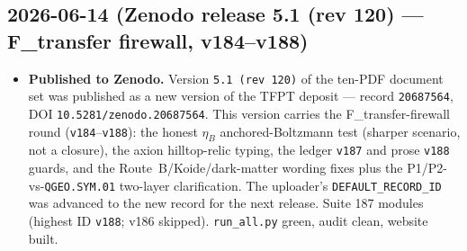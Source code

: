 \documentclass[11pt]{article}
\providecommand{\vref}[1]{\texttt{#1}}
\begin{document}
\subsection*{2026-06-14 (Zenodo release 5.1 (rev 120) --- F\_transfer firewall, v184--v188)}
\begin{itemize}
\item \textbf{Published to Zenodo.} Version \texttt{5.1 (rev 120)} of the ten-PDF document set was
  published as a new version of the TFPT deposit --- record \texttt{20687564},
  DOI \texttt{10.5281/zenodo.20687564}. This version carries the F\_transfer-firewall round
  (\vref{v184}--\vref{v188}): the honest $\eta_B$ anchored-Boltzmann test (sharper scenario, not a
  closure), the axion hilltop-relic typing, the ledger \texttt{v187} and prose \texttt{v188} guards, and
  the Route~B/Koide/dark-matter wording fixes plus the P1/P2-vs-\texttt{QGEO.SYM.01} two-layer
  clarification. The uploader's \texttt{DEFAULT\_RECORD\_ID} was advanced to the new record for the next
  release. Suite 187 modules (highest ID \texttt{v188}; v186 skipped). \texttt{run\_all.py} green, audit
  clean, website built.
\end{itemize}
\end{document}
